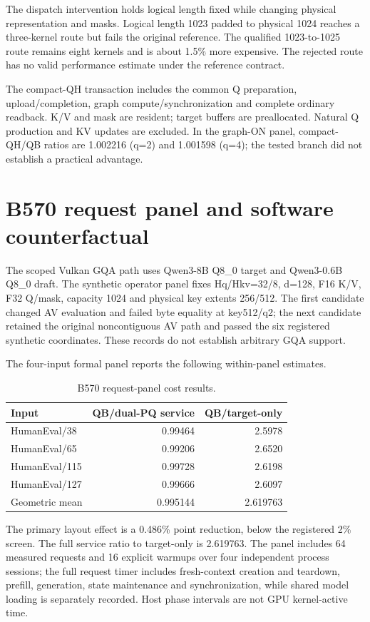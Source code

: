 The dispatch intervention holds logical length fixed while changing physical representation and masks. Logical length 1023 padded to physical 1024 reaches a three-kernel route but fails the original reference. The qualified 1023-to-1025 route remains eight kernels and is about 1.5\% more expensive. The rejected route has no valid performance estimate under the reference contract.

The compact-QH transaction includes the common Q preparation, upload/completion, graph compute/synchronization and complete ordinary readback. K/V and mask are resident; target buffers are preallocated. Natural Q production and KV updates are excluded. In the graph-ON panel, compact-QH/QB ratios are 1.002216 (q=2) and 1.001598 (q=4); the tested branch did not establish a practical advantage.

\section{B570 request panel and software counterfactual}
\label{app:b570}
The scoped Vulkan GQA path uses Qwen3-8B Q8_0 target and Qwen3-0.6B Q8_0 draft. The synthetic operator panel fixes Hq/Hkv=32/8, d=128, F16 K/V, F32 Q/mask, capacity 1024 and physical key extents 256/512. The first candidate changed AV evaluation and failed byte equality at key512/q2; the next candidate retained the original noncontiguous AV path and passed the six registered synthetic coordinates. These records do not establish arbitrary GQA support.

The four-input formal panel reports the following within-panel estimates.

\begin{table}[h]
\centering\small
\caption{B570 request-panel cost results.}
\begin{tabular}{@{}lrr@{}}
\toprule
Input & QB/dual-PQ service & QB/target-only \\
\midrule
HumanEval/38 & 0.99464 & 2.5978 \\
HumanEval/65 & 0.99206 & 2.6520 \\
HumanEval/115 & 0.99728 & 2.6198 \\
HumanEval/127 & 0.99666 & 2.6097 \\
\midrule
Geometric mean & 0.995144 & 2.619763 \\
\bottomrule
\end{tabular}
\end{table}

The primary layout effect is a 0.486\% point reduction, below the registered 2\% screen. The full service ratio to target-only is 2.619763. The panel includes 64 measured requests and 16 explicit warmups over four independent process sessions; the full request timer includes fresh-context creation and teardown, prefill, generation, state maintenance and synchronization, while shared model loading is separately recorded. Host phase intervals are not GPU kernel-active time.


